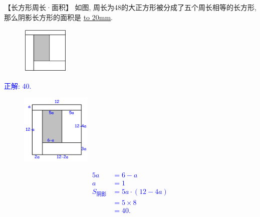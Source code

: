 \item {
    【长方形周长·面积】
    如图, 周长为48的大正方形被分成了五个周长相等的长方形, 那么阴影长方形的面积是 \underline{\hbox to 20mm{}}.
    \begin{figure}[H] 
        \centering
        \includegraphics[width=0.2\textwidth]{./pics/Chapter_2/2.png}
    \end{figure}
    \ifshowSolution 
        \fangsong{}\textcolor{blue}{
            正解: 40.\\
            \begin{figure}[H] 
                \centering
                \includegraphics[width=0.3\textwidth]{./pics/Chapter_2/seikai_2.png}
            \end{figure}
            \begin{align*}
                5a &= 6-a \\
                a &= 1 \\
                S_{阴影} &= 5a\cdot (12-4a) \\
                &= 5\times 8\\
                &= 40.
            \end{align*}
        }
    \else
        \vspace{1cm}
    \fi
}
